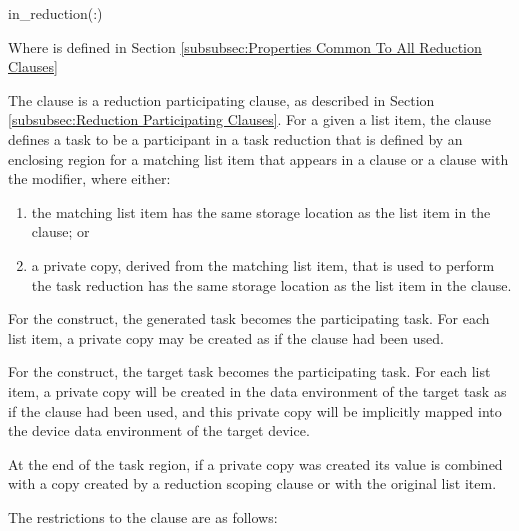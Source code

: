 \syntax
\begin{ompSyntax}
in_reduction(:)
\end{ompSyntax}
Where  is defined in Section \ref{subsubsec:Properties Common To All Reduction Clauses}

\descr

The  clause is a reduction participating clause, as
described in Section \ref{subsubsec:Reduction Participating Clauses}. For a
given a list item, the  clause defines a task to be a
participant in a task reduction that is defined by an enclosing region for a
matching list item that appears in a  clause or a
 clause with the  modifier, where either:
\begin{enumerate}

\item the matching list item has the same storage location as the list
    item in the  clause; or

\item a private copy, derived from the matching list item, that is used to
    perform the task reduction has the same storage location as the list item
    in the  clause.
\end{enumerate}

For the  construct, the generated task becomes the participating
task. For each list item, a private copy may be created as if the 
clause had been used.

For the  construct, the target task becomes the participating
task. For each list item, a private copy will be created in the data
environment of the target task as if the  clause had been used,
and this private copy will be implicitly mapped into the device data
environment of the target device.

At the end of the task region, if a private copy was created its value is
combined with a copy created by a reduction scoping clause or with the original
list item.

\restrictions
The restrictions to the  clause are as follows:


